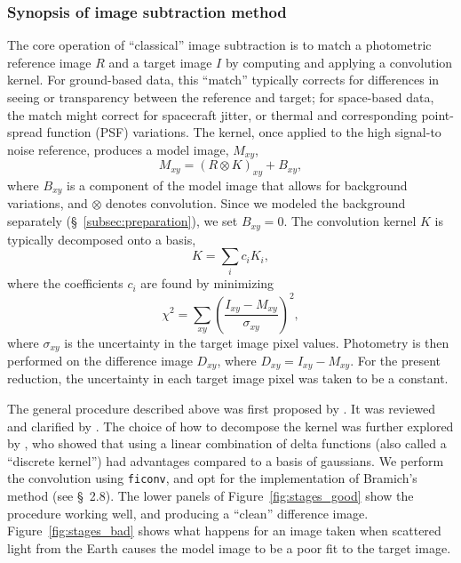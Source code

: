 \documentclass[12pt,twocolumn,tighten]{aastex62}
\begin{document}
\subsubsection{Synopsis of image subtraction method}

The core operation of ``classical'' image subtraction is to
match a photometric reference image $R$ and a target image $I$ by computing
and applying a convolution kernel.  For ground-based data, this
``match'' typically corrects for differences in seeing or transparency
between the reference and target; for space-based data, the match
might correct for spacecraft jitter, or thermal and corresponding
point-spread function (PSF) variations.  The kernel, once applied to
the high signal-to noise reference, produces a model image, $M_{xy}$,
\begin{equation}
    M_{xy} = (R \otimes K)_{xy} + B_{xy},
    \label{eq:imagemodel}
\end{equation}
where $B_{xy}$ is a component of the model image that allows for
background variations, and $\otimes$ denotes convolution.  Since we
modeled the background separately (\S~\ref{subsec:preparation}), we
set $B_{xy}=0$.  The convolution kernel $K$ is typically decomposed
onto a basis,
\begin{equation}
K = \sum_i c_i K_i,
\end{equation}
where the coefficients $c_i$ are found by minimizing
\begin{equation}
    \chi^2 = \sum_{xy} \left( \frac{I_{xy} - M_{xy}}{\sigma_{xy}} \right)^2,
    \label{eq:chisq_conv}
\end{equation}
where $\sigma_{xy}$ is the uncertainty in the target image pixel
values.  Photometry is then performed on the difference image
$D_{xy}$, where $D_{xy} = I_{xy} - M_{xy}$.  For the present
reduction, the uncertainty in each target image pixel was taken to be
a constant.	

The general procedure described above was first proposed by
\citet{Alard_Lupton_1998}.  It was reviewed and clarified by
\citet{miller_optimal_2008}.  The choice of how to decompose the
kernel was further explored by \citet{bramich_new_2008}, who showed
that using a linear combination of delta functions (also called
a ``discrete kernel'') had advantages
compared to a basis of gaussians.  We perform the convolution using
\texttt{ficonv}, and opt for the implementation of Bramich's method
(see \citealt{Pal_2009} \S~2.8).  The lower panels of
Figure~\ref{fig:stages_good} show the procedure working well, and
producing a ``clean'' difference image.  Figure~\ref{fig:stages_bad}
shows what happens for an image taken when scattered light from the
Earth causes the model image to be a poor fit to the target
image.
\end{document}
